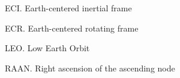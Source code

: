 \documentclass[oneside,12pt]{report}
\begin{document}
\noindent ECI.  Earth-centered inertial frame

\vspace{5pt}

\noindent ECR.  Earth-centered rotating frame

\vspace{5pt}

\noindent LEO.  Low Earth Orbit  

\vspace{5pt}

\noindent RAAN. Right ascension of the ascending node

\vspace{5pt}




\renewcommand\bibname{Selected Bibliography Including Cited Works}
\nocite{*}  %

\end{document}
